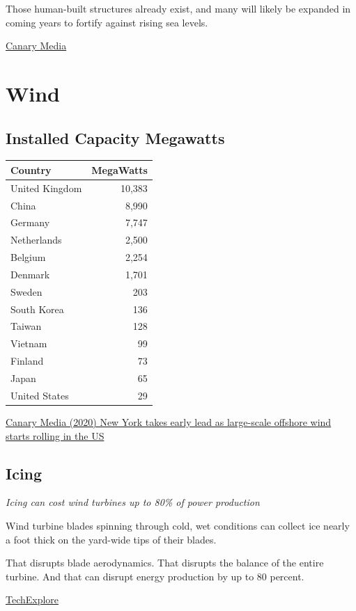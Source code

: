 \documentclass[
]{book}
\begin{document}
Those human-built structures already exist, and many will likely be expanded in coming years to fortify against rising sea levels.

\href{https://www.canarymedia.com/articles/ocean-energy/is-shore-based-wave-power-the-key-to-unlocking-affordable-clean-energy-from-the-sea}{Canary Media}

\hypertarget{wind}{%
\chapter{Wind}\label{wind}}

\hypertarget{installed-capacity-megawatts}{%
\section{Installed Capacity Megawatts}\label{installed-capacity-megawatts}}

\begin{longtable}[]{@{}lr@{}}
\toprule
Country & MegaWatts\tabularnewline
\midrule
\endhead
United Kingdom & 10,383\tabularnewline
China & 8,990\tabularnewline
Germany & 7,747\tabularnewline
Netherlands & 2,500\tabularnewline
Belgium & 2,254\tabularnewline
Denmark & 1,701\tabularnewline
Sweden & 203\tabularnewline
South Korea & 136\tabularnewline
Taiwan & 128\tabularnewline
Vietnam & 99\tabularnewline
Finland & 73\tabularnewline
Japan & 65\tabularnewline
United States & 29\tabularnewline
\bottomrule
\end{longtable}

\href{https://www.canarymedia.com/articles/wind/new-york-takes-early-lead-as-large-scale-offshore-wind-starts-rolling-in-the-us}{Canary Media (2020) New York takes early lead as large-scale offshore wind starts rolling in the US}

\hypertarget{icing}{%
\section{Icing}\label{icing}}

\emph{Icing can cost wind turbines up to 80\% of power production}

Wind turbine blades spinning through cold, wet conditions can collect ice nearly a foot thick on the yard-wide tips of their blades.

That disrupts blade aerodynamics. That disrupts the balance of the entire turbine. And that can disrupt energy production by up to 80 percent.

\href{https://techxplore.com/news/2021-03-field-icing-turbines-power-production.html}{TechExplore}
\end{document}
